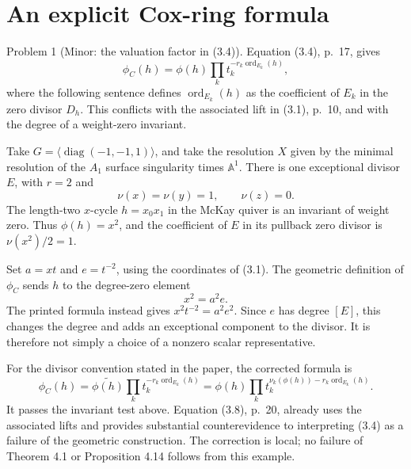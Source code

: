 \documentclass[10pt]{article}
\begin{document}
\section*{An explicit Cox-ring formula}
Problem 1 (Minor: the valuation factor in (3.4)).  Equation (3.4), p. 17, gives \[\phi_C(h)=\phi(h)\prod_k t_k^{-r_k\operatorname{ord}_{E_k}(h)},\] where the following sentence defines \(\operatorname{ord}_{E_k}(h)\) as the coefficient of \(E_k\) in the zero divisor \(D_h\). This conflicts with the associated lift in (3.1), p. 10, and with the degree of a weight-zero invariant.\par
Take \(G=\langle\operatorname{diag}(-1,-1,1)\rangle\), and take the resolution \(X\) given by the minimal resolution of the \(A_1\) surface singularity times \(\mathbb A^1\). There is one exceptional divisor \(E\), with \(r=2\) and \[\nu(x)=\nu(y)=1,\qquad \nu(z)=0.\] The length-two \(x\)-cycle \(h=x_0x_1\) in the McKay quiver is an invariant of weight zero. Thus \(\phi(h)=x^2\), and the coefficient of \(E\) in its pullback zero divisor is \(\nu(x^2)/2=1\).\par
Set \(a=xt\) and \(e=t^{-2}\), using the coordinates of (3.1). The geometric definition of \(\phi_C\) sends \(h\) to the degree-zero element \[x^2=a^2e.\] The printed formula instead gives \(x^2t^{-2}=a^2e^2\). Since \(e\) has degree \([E]\), this changes the degree and adds an exceptional component to the divisor. It is therefore not simply a choice of a nonzero scalar representative.\par
For the divisor convention stated in the paper, the corrected formula is \[\phi_C(h)=\widetilde{\phi(h)}
             \prod_k t_k^{-r_k\operatorname{ord}_{E_k}(h)}
 =\phi(h)\prod_k t_k^{\nu_k(\phi(h))-r_k\operatorname{ord}_{E_k}(h)}.\] It passes the invariant test above. Equation (3.8), p. 20, already uses the associated lifts and provides substantial counterevidence to interpreting (3.4) as a failure of the geometric construction. The correction is local; no failure of Theorem 4.1 or Proposition 4.14 follows from this example.\par
\end{document}
